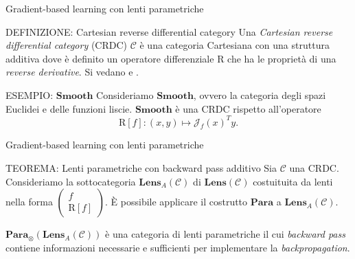 \documentclass{beamer}
\begin{document}
\begin{frame}{Gradient-based learning con lenti parametriche}
    \begin{block}{DEFINIZIONE: Cartesian reverse differential category}
        Una \textit{Cartesian reverse differential category} (CRDC) $\mathcal{C}$ è una categoria Cartesiana con una struttura additiva dove è definito un operatore differenziale $\mathrm{R}$ che ha le proprietà di una \textit{reverse derivative}.
        Si vedano \cite{cockett2019reverse} e \cite{gavranovic2024fundamental}.
      \end{block}

      \begin{block}{ESEMPIO: $\mathbf{Smooth}$}
        Consideriamo $\mathbf{Smooth}$, ovvero la categoria degli spazi Euclidei e delle funzioni liscie. $\mathbf{Smooth}$ è una CRDC rispetto all'operatore
        \[\mathrm{R}[f]: (x,y) \mapsto \mathcal{J}_f(x)^Ty.\]
      \end{block}
\end{frame}

\begin{frame}{Gradient-based learning con lenti parametriche}
    \begin{block}{TEOREMA: Lenti parametriche con backward pass additivo}
        Sia $\mathcal{C}$ una CRDC. Consideriamo la sottocategoria $\mathbf{Lens}_A(\mathcal{C})$ di $\mathbf{Lens}(\mathcal{C})$ costuituita da lenti nella forma $\left(\begin{smallmatrix} f \\ \mathrm{R}[f]\end{smallmatrix}\right)$. È possibile applicare il costrutto $\mathbf{Para}$ a $\mathbf{Lens}_A(\mathcal{C})$.
    \end{block}   

    $\mathbf{Para}_{\otimes}(\mathbf{Lens}_A(\mathcal{C}))$ è una categoria di lenti parametriche il cui \textit{backward pass} contiene informazioni necessarie e sufficienti per implementare la \textit{backpropagation}.
\end{frame}
\end{document}
